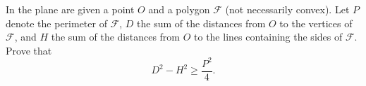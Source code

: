 In the plane are given a point $O$ and a polygon $\mathcal{F}$ (not necessarily convex). Let $P$ denote the perimeter of $\mathcal{F}$, $D$ the sum of the distances from $O$ to the vertices of $\mathcal{F}$, and $H$ the sum of the distances from $O$ to the lines containing the sides of $\mathcal{F}$. Prove that
\[ D^2 - H^2 \geq \frac{P^2}{4}. \]
